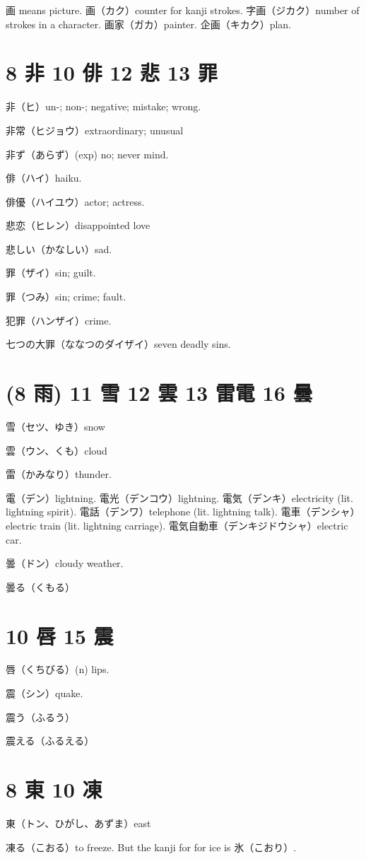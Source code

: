 画 means picture.
画（カク）counter for kanji strokes.
字画（ジカク）number of strokes in a character.
画家（ガカ）painter.
企画（キカク）plan.

\section{8 非 10 俳 12 悲 13 罪}

非（ヒ）un-; non-; negative; mistake; wrong.

非常（ヒジョウ）extraordinary; unusual

非ず（あらず）(exp) no; never mind.

俳（ハイ）haiku.

俳優（ハイユウ）actor; actress.

悲恋（ヒレン）disappointed love

悲しい（かなしい）sad.

罪（ザイ）sin; guilt.

罪（つみ）sin; crime; fault.

犯罪（ハンザイ）crime.

七つの大罪（ななつのダイザイ）seven deadly sins.

\section{(8 雨) 11 雪 12 雲 13 雷電 16 曇}

雪（セツ、ゆき）snow

雲（ウン、くも）cloud

雷（かみなり）thunder.

電（デン）lightning.
電光（デンコウ）lightning.
電気（デンキ）electricity (lit. lightning spirit).
電話（デンワ）telephone (lit. lightning talk).
電車（デンシャ）electric train (lit. lightning carriage).
電気自動車（デンキジドウシャ）electric car.

曇（ドン）cloudy weather.

曇る（くもる）

\section{10 唇 15 震}

唇（くちびる）(n) lips.

震（シン）quake.

震う（ふるう）

震える（ふるえる）

\section{8 東 10 凍}

東（トン、ひがし、あずま）east

凍る（こおる）to freeze.
But the kanji for for ice is 氷（こおり）.
